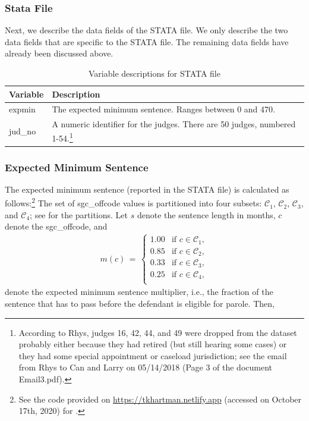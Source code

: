 \documentclass[11pt]{article}
\theoremstyle{ModifiedStyle}
\begin{document}
    \subsubsection{Stata File}
    	\label{Sec:Data_Description:STATA}
    	Next, we describe the data fields of the STATA file. We only describe the two data fields that are specific to the STATA file. The remaining data fields have already been discussed above.

      \begin{table}[H]
        \centering
        \caption{Variable descriptions for STATA file}
        \label{tab:stata-vars}
        \begin{tabular}{|ll|}
        \hline
        \textbf{Variable} & \textbf{Description}                                                        \\ \hline
        expmin              & The expected minimum sentence. Ranges between 0 and 470.                \\
        jud\_no          & A numeric identifier for the judges. There are 50 judges, numbered 1-54.\footnote{According to Rhys, judges 16, 42, 44, and 49 were dropped from the dataset probably either because they had retired (but still hearing some cases) or they had some special appointment or caseload jurisdiction; see the email from Rhys to Can and Larry on 05/14/2018 (Page 3 of the document Email3.pdf).}\\ \hline
        \end{tabular}
      \end{table}

    \subsubsection{Expected Minimum Sentence}
      The expected minimum sentence (reported in the STATA file) is calculated as follows:\footnote{See the code provided on \url{https://tkhartman.netlify.app} (accessed on October 17th, 2020) for \cite{hester2017conditional}.} The set of sgc\_offcode values is partitioned into four subsets: $\mathcal{C}_1$, $\mathcal{C}_2$, $\mathcal{C}_3$, and $\mathcal{C}_4$; see \cite{hester2017conditional} for the partitions. Let $s$ denote the sentence length in months, $c$ denote the sgc\_offcode, and
        \begin{align*}
          m(c) \,=\, \left \{\!\! \begin{array}{ll}
          1.00 & \text{if } c \in \mathcal{C}_1, \\
          0.85 & \text{if } c \in \mathcal{C}_2, \\
          0.33 & \text{if } c \in \mathcal{C}_3, \\
          0.25 & \text{if } c \in \mathcal{C}_4, \\
          \end{array} \right.
        \end{align*}
        denote the expected minimum sentence multiplier, i.e., the fraction of the sentence that has to pass before the defendant is eligible for parole. Then,
\end{document}
